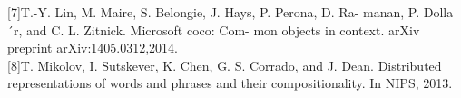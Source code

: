 \documentclass[12pt]{article}%
\begin{document}
%
%
%
%
%
%

[7]T.-Y. Lin, M. Maire, S. Belongie, J. Hays, P. Perona, D. Ra- manan, P. Dolla´r, and C. L. Zitnick.  Microsoft coco:  Com- mon objects in context. arXiv preprint arXiv:1405.0312,2014.\\

%
%

[8]T. Mikolov, I. Sutskever, K. Chen, G. S. Corrado, and
J. Dean. Distributed representations of words and phrases and their compositionality. In NIPS, 2013.\\
\end{document}
